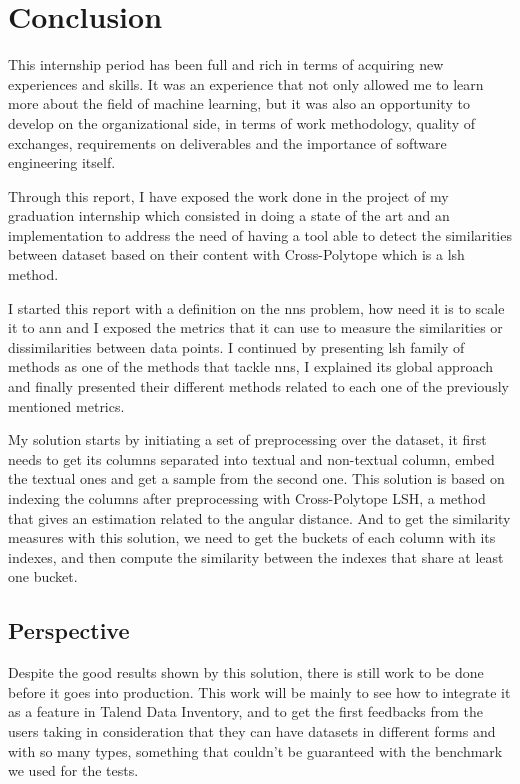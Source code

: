 \chapter*{Conclusion}

This internship period has been full and rich in terms of acquiring new
experiences and skills. It was an experience that not only allowed me to learn
more about the field of machine learning, but it was also an opportunity to
develop on the organizational side, in terms of work methodology, quality of
exchanges, requirements on deliverables and the importance of software
engineering itself. 


Through this report, I have exposed the work done in the project of my graduation
internship which consisted in doing a state of the art and an implementation to
address the need of having a tool able to detect the similarities between
dataset based on their content with Cross-Polytope which is a \acrfull{lsh}
method.

I started this report with a definition on the \acrfull{nns} problem, how need
it is to scale it to \acrfull{ann} and I exposed the metrics that it can use to
measure the similarities or dissimilarities between data points. I continued by
presenting \acrshort{lsh} family of methods as one of the methods that tackle
\acrshort{nns}, I explained its global approach and finally presented their
different methods related to each one of the previously mentioned metrics.

My solution starts by initiating a set of preprocessing over the dataset, it
first needs to get its columns separated into textual and non-textual column,
embed the textual ones and get a sample from the second one. This solution is
based on indexing the columns after preprocessing with Cross-Polytope LSH, a
method that gives an estimation related to the angular distance. And to get the
similarity measures with this solution, we need to get the buckets of each
column with its indexes, and then compute the similarity between the indexes that share at least one bucket.


\section*{Perspective}
Despite the good results shown by this solution, there is still work to be done
before it goes into production. This work will be mainly to see how to integrate
it as a feature in Talend Data Inventory, and to get the first feedbacks from
the users taking in consideration that they can have datasets in different forms
and with so many types, something that couldn't be guaranteed with the benchmark
we used for the tests.